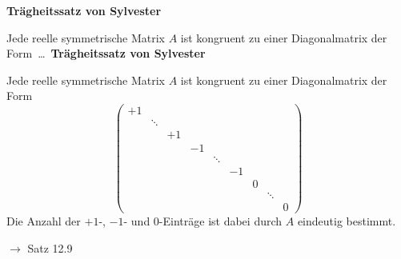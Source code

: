 \documentclass[11pt]{article}
\renewcommand{\cite}[1]{\par\bigskip\hfill{\color{gray}\tiny\(\to\) #1}}
\let\olddots\dots
\renewcommand{\dots}{\,\olddots\,}
\newenvironment{field}{}{\newpage}
\newif\ifnote
\newenvironment{note}{\notetrue}{\notefalse}
\newcommand{\localtag}{}
\newcommand{\globaltag}{}
\newcommand{\uuid}{}
\newcommand{\tags}[1]{
    \ifnote
        \renewcommand{\localtag}{#1}
    \else
        \renewcommand{\globaltag}{#1}
    \fi
    }
\newcommand{\xplain}[1]{\renewcommand{\uuid}{#1}}
\begin{document}
\begin{note}
    \tags{Satz}
    \xplain{b5290b76-3aa7-435f-bbb1-6b0a9d3294ee}

    \begin{field}
        \textbf{Trägheitssatz von Sylvester}

        Jede reelle symmetrische Matrix $A$ ist kongruent zu einer Diagonalmatrix der Form \dots
    \end{field}
    \begin{field}
        \textbf{Trägheitssatz von Sylvester}

        Jede reelle symmetrische Matrix $A$ ist kongruent zu einer Diagonalmatrix der Form
        \[\left(\begin{smallmatrix}
            +1\\
            &\ddots\\
            &&+1\\
            &&&-1\\
            &&&&\ddots\\
            &&&&&-1\\
            &&&&&&0\\
            &&&&&&&\ddots\\
            &&&&&&&&0
        \end{smallmatrix}\right)\]
        Die Anzahl der $+1$-, $-1$- und $0$-Einträge ist dabei durch $A$ eindeutig bestimmt.
        \cite{Satz 12.9}
    \end{field}
\end{note}
\end{document}
